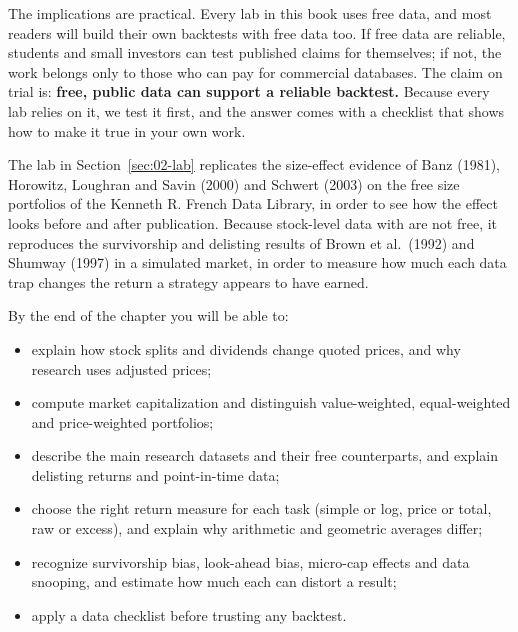 The implications are practical. Every lab in this book uses free data, and most readers will build their own backtests with free data too. If free data are reliable, students and small investors can test published claims for themselves; if not, the work belongs only to those who can pay for commercial databases. The claim on trial is: \textbf{free, public data can support a reliable backtest.} Because every lab relies on it, we test it first, and the answer comes with a checklist that shows how to make it true in your own work.

The lab in Section~\ref{sec:02-lab} replicates the size-effect evidence of Banz (1981), Horowitz, Loughran and Savin (2000) and Schwert (2003) on the free size portfolios of the Kenneth R. French Data Library, in order to see how the effect looks before and after publication. Because stock-level data with  are not free, it reproduces the survivorship and delisting results of Brown et al.\ (1992) and Shumway (1997) in a simulated market, in order to measure how much each data trap changes the return a strategy appears to have earned.

By the end of the chapter you will be able to:

\begin{itemize}
  \item explain how stock splits and dividends change quoted prices, and why research uses adjusted prices;
  \item compute market capitalization and distinguish value-weighted, equal-weighted and price-weighted portfolios;
  \item describe the main research datasets and their free counterparts, and explain delisting returns and point-in-time data;
  \item choose the right return measure for each task (simple or log, price or total, raw or excess), and explain why arithmetic and geometric averages differ;
  \item recognize survivorship bias, look-ahead bias, micro-cap effects and data snooping, and estimate how much each can distort a result;
  \item apply a data checklist before trusting any backtest.
\end{itemize}

